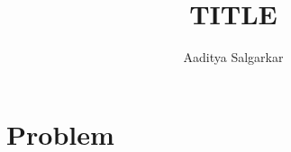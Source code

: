\documentclass{article}
\theoremstyle{theorem}
\theoremstyle{definition}
\begin{document}
\title{TITLE}
\author{Aaditya Salgarkar}

\maketitle

\begin{abstract}
\end{abstract}

\noindent


\section{Problem}
\end{document}
